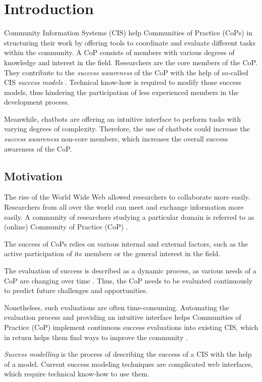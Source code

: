 \chapter{Introduction}
Community Information Systems (CIS) help Communities of Practice (CoPs) in structuring their work by offering tools to coordinate and evaluate different tasks within the community.
A CoP consists of members with various degrees of knowledge and interest in the field.
Researchers are the core members of the CoP.
They contribute to the \emph{success awareness} of the CoP with the help of so-called CIS \emph{success models} \cite{Klam10c}.
Technical know-how is required to modify those success models, thus hindering the participation of less experienced members
in the development process.

Meanwhile, chatbots are offering an intuitive interface to perform tasks with varying degrees of complexity. 
Therefore, the use of chatbots could increase the \emph{success awareness} non-core members, which increases the overall success awareness of the CoP.

\section{Motivation}
The rise of the World Wide Web allowed researchers to collaborate more easily. Researchers from all over the world can meet and exchange information more easily. A community of researchers studying a particular domain is referred to as (online) Community of Practice (CoP) \cite{Renz08}.

The success of CoPs relies on various internal and external factors, such as the active participation of its members or the general interest in the field.

The evaluation of success is described as a dynamic process, as various needs of a CoP are changing over time \cite{Renz08,GKJa08}.
Thus, the CoP needs to be evaluated continuously to predict future challenges and opportunities.

Nonetheless, such evaluations are often time-consuming. Automating the evaluation process and providing an intuitive interface helps Communities of Practice (CoP) implement continuous success evaluations into existing CIS, which in return helps them find ways to improve the community \cite{Renz08}.

\emph{Success modelling} is the process of describing the success of a CIS with the help of a model. 
Current success modeling techniques are complicated web interfaces, which require technical know-how to use them.

